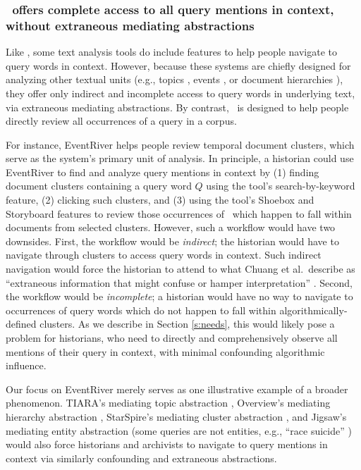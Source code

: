 \subsubsection{\ours~offers complete access to all query mentions in context, without extraneous mediating abstractions}
Like \ours, some text analysis tools do include features to help people navigate to query words in context.
However, because these systems are chiefly designed for analyzing other textual units (e.g., topics \cite{tiara}, events \cite{eventriver}, or document hierarchies \cite{overview}), they offer only indirect and incomplete access to query words in underlying text, via extraneous mediating abstractions.
By contrast, \ours~is designed to help people directly review all occurrences of a query in a corpus. 

For instance, EventRiver \cite{eventriver} helps people review temporal document clusters, which serve as the system's primary unit of analysis. 
In principle, a historian could use EventRiver to find and analyze query mentions in context by (1) finding document clusters containing a query word $Q$ using the tool's search-by-keyword feature, (2) clicking such clusters, and (3) using the tool's Shoebox and Storyboard features to review those occurrences of \Q~which happen to fall within documents from selected clusters.
However, such a workflow would have two downsides. 
First, the workflow would be \textit{indirect}; the historian would have to navigate through clusters to access query words in context.
Such indirect navigation would force the historian to attend to what Chuang et al.\ describe as ``extraneous information that might confuse or hamper interpretation'' \cite{chuangheer}.
Second, the workflow would be \textit{incomplete}; a historian would have no way to navigate to occurrences of query words which do not happen to fall within algorithmically-defined clusters. 
As we describe in Section \ref{s:needs}, this would likely pose a problem for historians, who need to directly and comprehensively observe all mentions of their query in context, with minimal confounding algorithmic influence.

Our focus on EventRiver merely serves as one illustrative example of a broader phenomenon. 
TIARA's mediating topic abstraction \cite{tiara}, Overview's mediating hierarchy abstraction \cite{overview}, StarSpire's mediating cluster abstraction \cite{starspire}, and Jigsaw's mediating entity abstraction \cite{Gorg2013JigsawReflections} (some queries are not entities, e.g., ``race suicide'' \cite{racesuicide}) would also force historians and archivists to navigate to query mentions in context via similarly confounding and extraneous abstractions.

